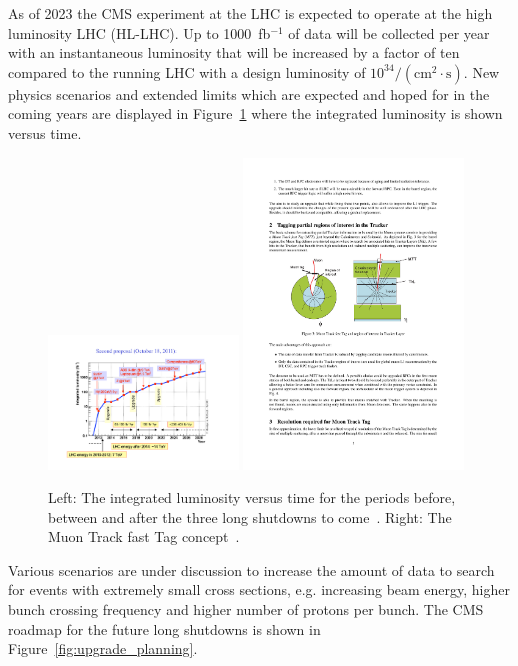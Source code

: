 As of 2023 the CMS experiment at the LHC is expected to operate at the high luminosity LHC (HL-LHC). Up to 1000~fb$^{-1}$ of data will be collected per year with an 
instantaneous luminosity that will be increased by a factor of ten compared to the running LHC with a design luminosity of $10^{34}/(\mathrm{cm}^2 \cdot\mathrm{s})$. New physics 
scenarios and extended limits which are expected and hoped for in the coming years are displayed in Figure~\ref{fig:schedule_concept} where the integrated luminosity is shown versus 
time. 
\begin{figure}[htbp]
\centering
\includegraphics[width=0.45\textwidth]{Figures/pooth/schedule.pdf}
\includegraphics[width=0.52\textwidth]{Figures/pooth/mtt_concept_a.pdf}
\caption{Left: The integrated luminosity versus time for the periods before, between and after the three long shutdowns to come~\cite{schedule}. Right: The Muon Track fast Tag concept~\cite{mtt_concept}. } 
\label{fig:schedule_concept}
\end{figure}
Various scenarios are under discussion to increase the amount of data to search for events with extremely small cross sections, e.g. increasing beam energy, higher bunch 
crossing frequency and higher number of protons per bunch. The CMS roadmap for the future long shutdowns is shown in Figure~\ref{fig:upgrade_planning}.
